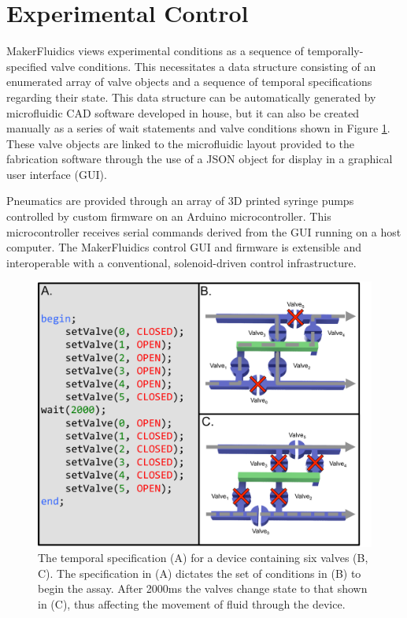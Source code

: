 \section{Experimental Control}
\label{sec:mfControl}
MakerFluidics views experimental conditions as a sequence of temporally-specified valve conditions. This necessitates a data structure consisting of an enumerated array of valve objects and a sequence of temporal specifications regarding their state. This data structure can be automatically generated by microfluidic CAD software developed in house, but it can also be created manually as a series of wait statements and valve conditions shown in Figure \ref{fig:sequence}. These valve objects are linked to the microfluidic layout provided to the fabrication software through the use of a JSON object for display in a graphical user interface (GUI).

Pneumatics are provided through an array of 3D printed syringe pumps controlled by custom firmware on an Arduino microcontroller. This microcontroller receives serial commands derived from the GUI running on a host computer. The MakerFluidics control GUI and firmware is extensible and interoperable with a conventional, solenoid-driven control infrastructure.

\begin{figure}[h]
  \begin{minipage}[t]{0.99\linewidth}\centering
    \includegraphics[width=14cm]{sequence.pdf}
    \medskip
  \end{minipage}\hfill
  \caption[Valving sequence temporal specification]{The temporal specification (A) \cite{thies2008} for a device containing six valves (B, C). The specification in (A) dictates the set of conditions in (B) to begin the assay. After 2000ms the valves change state to that shown in (C), thus affecting the movement of fluid through the device.}
    \label{fig:sequence}
\end{figure}
